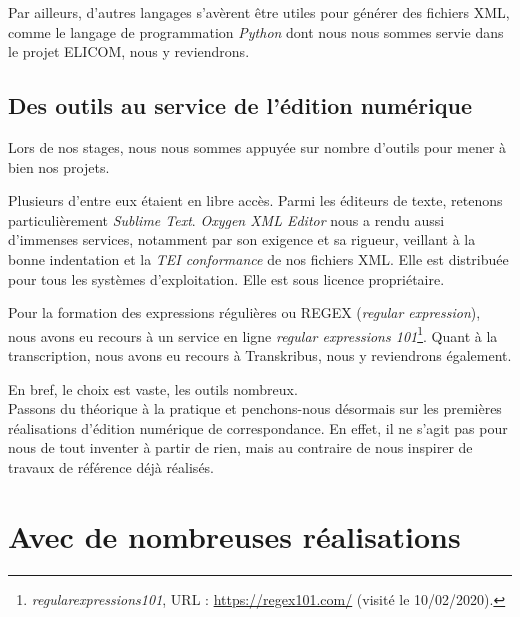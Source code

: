 Par ailleurs, d'autres langages s'avèrent être utiles pour générer des fichiers XML, comme le langage de programmation \emph{Python} dont nous nous sommes servie dans le projet ELICOM, nous y reviendrons.

\subsection{Des outils au service de l'édition numérique}

Lors de nos stages, nous nous sommes appuyée sur nombre d'outils pour mener à bien nos projets.

Plusieurs d'entre eux étaient en libre accès. Parmi les éditeurs de texte, retenons particulièrement \emph{Sublime Text}. \emph{Oxygen XML Editor} nous a rendu aussi d'immenses services, notamment par son exigence et sa rigueur, veillant à la bonne indentation et la \emph{TEI conformance} de nos fichiers XML. Elle est distribuée pour tous les systèmes d’exploitation. Elle est sous licence propriétaire.

Pour la formation des expressions régulières ou REGEX (\emph{regular expression}), nous avons eu recours à un service en ligne \emph{regular expressions 101}\footnote{\emph{regularexpressions101}, URL : \url{https://regex101.com/} (visité le 10/02/2020).}. Quant à la transcription, nous avons eu recours à Transkribus, nous y reviendrons également. 

En bref, le choix est vaste, les outils nombreux.\\

Passons du théorique à la pratique et penchons-nous désormais sur les premières réalisations d'édition numérique de correspondance. En effet, il ne s'agit pas pour nous de tout inventer à partir de rien, mais au contraire de nous inspirer de travaux de référence déjà réalisés.

\section{Avec de nombreuses réalisations}

